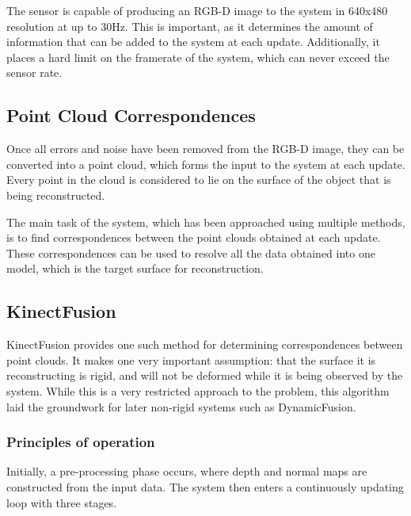 \documentclass[a4paper]{article}
\begin{document}
The sensor is capable of producing an RGB-D image to the system in 640x480 resolution at up to 30Hz. This is important, as it determines the amount of information that can be added to the system at each update. Additionally, it places a hard limit on the framerate of the system, which can never exceed the sensor rate.

\subsection{Point Cloud Correspondences}

Once all errors and noise have been removed from the RGB-D image, they can be converted into a point cloud, which forms the input to the system at each update. Every point in the cloud is considered to lie on the surface of the object that is being reconstructed. 

The main task of the system, which has been approached using multiple methods, is to find correspondences between the point clouds obtained at each update. These correspondences can be used to resolve all the data obtained into one model, which is the target surface for reconstruction.


\subsection{KinectFusion}

KinectFusion provides one such method for determining correspondences between point clouds. It makes one very important assumption: that the surface it is reconstructing is rigid, and will not be deformed while it is being observed by the system. While this is a very restricted approach to the problem, this algorithm laid the groundwork for later non-rigid systems such as DynamicFusion.


\subsubsection{Principles of operation}

Initially, a pre-processing phase occurs, where depth and normal maps are constructed from the input data. The system then enters a continuously updating loop with three stages.
\end{document}
